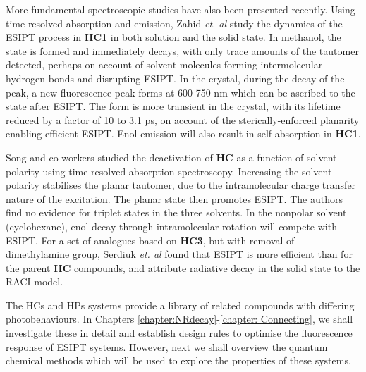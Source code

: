 More fundamental spectroscopic studies have also been presented recently. Using time-resolved absorption and emission, Zahid \textit{et. al} study the dynamics of the ESIPT process in \textbf{HC1} in both solution and the solid state.\cite{Zahid2017} In methanol, the \Estar{} state is formed and immediately decays, with only trace amounts of the \Kstar{} tautomer detected, perhaps on account of solvent molecules forming intermolecular hydrogen bonds and disrupting ESIPT. In the crystal, during the decay of the \Estar{} peak, a new fluorescence peak forms at 600-750 nm which can be ascribed to the \Kstar{} state after ESIPT. The \Estar{} form is more transient in the crystal, with its lifetime reduced by a factor of 10 to 3.1 ps, on account of the sterically-enforced planarity enabling efficient ESIPT. Enol emission will also result in self-absorption in \textbf{HC1}.

Song and co-workers studied the deactivation of \textbf{HC} as a function of solvent polarity using time-resolved absorption spectroscopy.\cite{Song2018} Increasing the solvent polarity stabilises the planar \Estar{} tautomer, due to the intramolecular charge transfer nature of the excitation. The planar \Estar{} state then promotes ESIPT. The authors find no evidence for triplet states in the three solvents. In the nonpolar solvent (cyclohexane), enol decay through intramolecular rotation will compete with ESIPT. For a set of analogues based on \textbf{HC3}, but with removal of dimethylamine group, Serdiuk \textit{et. al} found that ESIPT is more efficient than for the parent \textbf{HC} compounds, and attribute radiative decay in the solid state to the RACI model.\cite{Serdiuk2018}

The \acp{HC} and \acp{HP} systems provide a library of related compounds with differing photobehaviours. In Chapters \ref{chapter:NRdecay}-\ref{chapter: Connecting}, we shall investigate these in detail and establish design rules to optimise the fluorescence response of \ac{ESIPT} systems. However, next we shall overview the quantum chemical methods which will be used to explore the properties of these systems.


